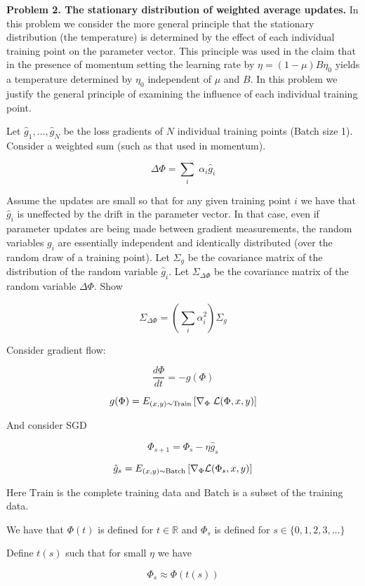 \documentclass{article}
\begin{document}
\bigskip

{\bf Problem 2. The stationary distribution of weighted average updates.}  In this problem we consider the more general principle that the
stationary distribution (the temperature) is determined by the effect of each individual training point on the parameter vector.  This principle was used in the
claim that in the presence of momentum setting the learning rate by $\eta = (1-\mu)B\eta_0$ yields a temperature determined by $\eta_0$ independent of
$\mu$ and $B$.
In this problem we justify the general principle of examining the influence of each individual training point.

\medskip
Let $\hat{g}_1, \ldots, \hat{g}_N$
be the loss gradients of $N$ individual training points (Batch size 1).  Consider a weighted sum (such as that used in momentum).

$$\Delta \Phi = \sum_i\; \alpha_i\hat{g}_i$$

Assume the updates are small so that for any given training point $i$ we have that $\hat{g}_i$ is uneffected by the drift in the parameter vector.
In that case, even if parameter updates are being made between gradient measurements, the random variables $g_i$ are essentially independent
and identically distributed (over the random draw of a training point).  Let $\Sigma_g$ be the covariance matrix of the distribution of the
random variable $\hat{g}_i$.  Let $\Sigma_{\Delta \Phi}$ be the covariance matrix of the random variable $\Delta \Phi$.
Show

$$\Sigma_{\Delta \Phi} = \left(\sum_i \alpha_i^2\right)\Sigma_g$$


Consider gradient flow:

$$\frac{d\Phi}{dt} = -g(\Phi)$$

$$g(\Phi) = E_{(x,y) \sim \mathrm{Train}}\left[ \nabla_\Phi\;{\cal L}(\Phi,x,y)\right]$$

And consider SGD

$$\Phi_{s+1} = \Phi_s - \eta \hat{g}_s$$

$$\hat{g}_s = E_{(x,y) \sim \mathrm{Batch}}\left[\nabla_\Phi {\cal L}(\Phi_s,x,y)\right]$$

Here $\mathrm{Train}$ is the complete training data and $\mathrm{Batch}$ is a subset of the training data.

We have that $\Phi(t)$ is defined for $t \in \mathbb{R}$ and $\Phi_s$ is defined for $s \in \{0,1,2,3,\ldots\}$

Define $t(s)$ such that for small $\eta$ we have

$$\Phi_s \approx \Phi(t(s))$$
\end{document}
